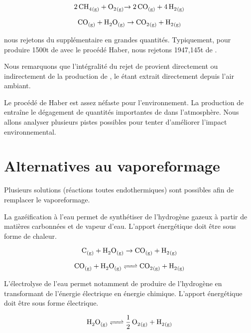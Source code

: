 \documentclass[a4paper, oneside, 12pt]{article}
\begin{document}
\begin{equation*}
	\ce{2 \, CH4_{(g)} + O2_{(g)} \rightarrow {2} \, CO_{(g)} + 4 \, H2_{(g)}} 
\end{equation*}

\begin{equation*}
	\ce{CO_{(g)} + H2O_{(g)} \rightarrow CO2_{(g)} + H2_{(g)}} 
\end{equation*}

nous rejetons du  supplémentaire en grandes quantités. Typiquement, pour produire 1500t de  avec le procédé Haber, nous rejetons 1947,145t de .

Nous remarquons que l'intégralité du rejet de  provient directement ou indirectement de la production de , le  étant extrait directement depuis l'air ambiant.

Le procédé de Haber est assez néfaste pour l'environnement. La production de  entraîne le dégagement de quantités importantes de  dans l'atmosphère.
Nous allons analyser plusieurs pistes possibles pour tenter d'améliorer l'impact environnemental.

\section*{Alternatives au vaporeformage}

Plusieurs solutions (réactions toutes endothermiques) sont possibles afin de remplacer le vaporeformage.

La gazéification à l'eau permet de synthétiser de l'hydrogène gazeux à partir de matières carbonnées et de vapeur d'eau.
L'apport énergétique doit être sous forme de chaleur.

\begin{equation*}
	\ce{C_{(g)} + H2O_{(g)} \rightarrow CO_{(g)} + H2_{(g)}} 
\end{equation*}

\begin{equation*}
	\ce{CO_{(g)} + H2O_{(g)} <=> CO2_{(g)} + H2_{(g)}} 
\end{equation*}

L'électrolyse de l'eau permet notamment de produire de l'hydrogène en transformant de l'énergie électrique en énergie chimique.
L'apport énergétique doit être sous forme électrique.

\begin{equation*}
	\ce{H2O_{(g)} <=> \frac{1}{2} \, O2_{(g)} + H2_{(g)}} 
\end{equation*}
\end{document}
